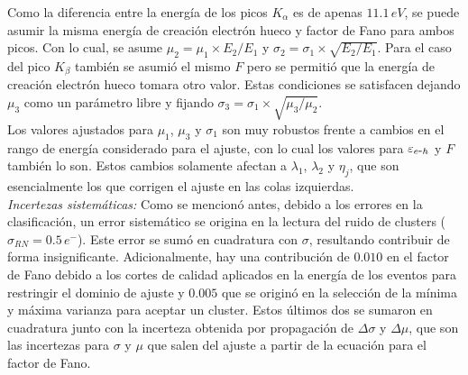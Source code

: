 {\indent Como la diferencia entre la energía de los picos $K_{\alpha}$ es de apenas $11.1\,\si{eV}$, se puede asumir la misma energía de creación electrón hueco y factor de Fano para ambos picos. Con lo cual, se asume $\mu_{2} = \mu_{1} \times E_{2}/E_{1}$ y $\sigma_{2} = \sigma_{1}\times \sqrt{E_{2}/E_{1}}$. Para el caso del pico $K_{\beta}$ también se asumió el mismo $F$ pero se permitió que la energía de creación electrón hueco tomara otro valor. Estas condiciones se satisfacen dejando $\mu_{3}$ como un parámetro libre y fijando $\sigma_{3} = \sigma_{1}\times \sqrt{\mu_{3}/\mu_{2}}$.\\
%
Los valores ajustados para $\mu_{1}$, $\mu_{3}$ y $\sigma_{1}$ son muy robustos frente a cambios en el rango de energía considerado para el ajuste, con lo cual los valores para $\varepsilon_{e\mbox{-}h}$ y $F$ también lo son. Estos cambios solamente afectan a $\lambda_{1}$, $\lambda_{2}$ y $\eta_{j}$, que son esencialmente los que corrigen el ajuste en las colas izquierdas.\\
\indent \textit{Incertezas sistemáticas:} Como se mencionó antes, debido a los errores en la clasificación, un error sistemático se origina en la lectura del ruido de clusters ($\sigma_{RN} =0.5\,e^{-}$). Este error se sumó en cuadratura con $\sigma$, resultando contribuir de forma insignificante. Adicionalmente, hay una contribución de $0.010$ en el factor de Fano debido a los cortes de calidad aplicados en la energía de los eventos para restringir el dominio de ajuste y $0.005$ que se originó en la selección de la mínima y máxima varianza para aceptar un cluster. Estos últimos dos se sumaron en cuadratura junto con la incerteza obtenida por propagación de $\Delta \sigma$ y $\Delta \mu$, que son las incertezas para $\sigma$ y $\mu$ que salen del ajuste a partir de la ecuación para el factor de Fano.
}
